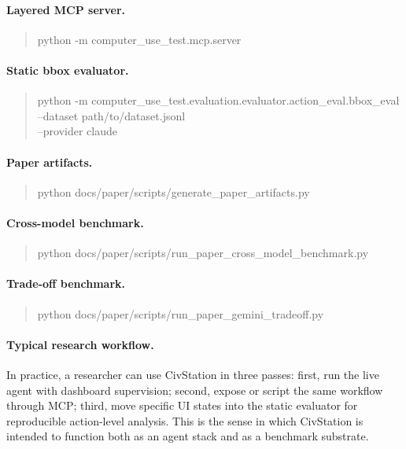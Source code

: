 \paragraph{Layered MCP server.}
\begin{quote}
\ttfamily
python -m computer\_use\_test.mcp.server
\end{quote}

\paragraph{Static bbox evaluator.}
\begin{quote}
\scriptsize\ttfamily
python -m computer\_use\_test.evaluation.evaluator.action\_eval.bbox\_eval\\
--dataset path/to/dataset.jsonl\\
--provider claude
\end{quote}

\paragraph{Paper artifacts.}
\begin{quote}
\ttfamily
python docs/paper/scripts/generate\_paper\_artifacts.py
\end{quote}

\paragraph{Cross-model benchmark.}
\begin{quote}
\ttfamily
python docs/paper/scripts/run\_paper\_cross\_model\_benchmark.py
\end{quote}

\paragraph{Trade-off benchmark.}
\begin{quote}
\ttfamily
python docs/paper/scripts/run\_paper\_gemini\_tradeoff.py
\end{quote}

\paragraph{Typical research workflow.}
In practice, a researcher can use CivStation in three passes: first, run the live agent with dashboard supervision; second, expose or script the same workflow through MCP; third, move specific UI states into the static evaluator for reproducible action-level analysis. This is the sense in which CivStation is intended to function both as an agent stack and as a benchmark substrate.

